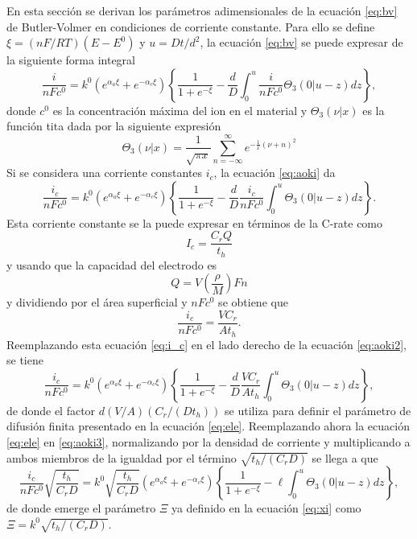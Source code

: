 En esta sección se derivan los parámetros adimensionales de la ecuación
\ref{eq:bv} de Butler-Volmer en condiciones de corriente constante. Para ello se 
define $\xi = (nF/RT)(E - E^0)$ y $u = D t / d^2$, la ecuación \ref{eq:bv} se 
puede expresar de la siguiente forma integral \cite{aoki1984}
\begin{equation}\label{eq:aoki}
    \frac{i}{n F c^0} = k^0 \left(e^{\alpha_a \xi} + e^{-\alpha_c \xi}\right) \left\{ \frac{1}{1+e^{-\xi}} - \frac{d}{D} \int_0^u \frac{i}{n F c^0} \Theta_3(0|u - z) dz \right\},
\end{equation}
donde $c^0$ es la concentración máxima del ion en el material y $\Theta_3(\nu|x)$ 
es la función tita \cite{bieniasz2015} dada por la siguiente expresión
\begin{equation}
    \Theta_3(\nu|x) = \frac{1}{\sqrt{\pi x}} \sum_{n=-\infty}^{\infty} e^{-\frac{1}{x}(\nu + n)^2}
\end{equation}
Si se considera una corriente constantes $i_c$, la ecuación \ref{eq:aoki} da
\begin{equation}\label{eq:aoki2}
    \frac{i_c}{n F c^0} = k^0 \left(e^{\alpha_a \xi} + e^{-\alpha_c \xi}\right) \left\{ \frac{1}{1+e^{-\xi}} - \frac{d}{D} \frac{i_c}{n F c^0} \int_0^u \Theta_3(0|u - z) dz \right\}.
\end{equation}
Esta corriente constante se la puede expresar en términos de la C-rate como
\begin{equation}
    I_c = \frac{C_r Q}{t_h}
\end{equation}
y usando que la capacidad del electrodo es
\begin{equation}
    Q = V \left( \frac{\rho}{M} \right) F n
\end{equation}
y dividiendo por el área superficial y $n F c^0$ se obtiene que
\begin{equation}\label{eq:i_c}
    \frac{i_c}{n F c^0} = \frac{V C_r}{A t_h}.
\end{equation}
Reemplazando esta ecuación \ref{eq:i_c} en el lado derecho de la ecuación 
\ref{eq:aoki2}, se tiene
\begin{equation}\label{eq:aoki3}
    \frac{i_c}{n F c^0} = k^0 \left(e^{\alpha_a \xi} + e^{-\alpha_c \xi}\right) \left\{ \frac{1}{1+e^{-\xi}} - \frac{d}{D} \frac{V C_r}{A t_h} \int_0^u \Theta_3(0|u - z) dz \right\},
\end{equation}
de donde el factor $d (V/A) (C_r / (D t_h))$ se utiliza para definir el 
parámetro de difusión finita presentado en la ecuación \ref{eq:ele}. Reemplazando 
ahora la ecuación \ref{eq:ele} en \ref{eq:aoki3}, normalizando por la densidad 
de corriente y multiplicando a ambos miembros de la igualdad por el término 
$\sqrt{t_h / (C_r D)}$ se llega a que
\begin{equation}\label{eq:aoki4}
    \frac{i_c}{n F c^0} \sqrt{\frac{t_h}{C_r D}} = k^0 \sqrt{\frac{t_h}{C_r D}}\left(e^{\alpha_a \xi} + e^{-\alpha_c \xi}\right) \left\{ \frac{1}{1+e^{-\xi}} - \ell \int_0^u \Theta_3(0|u - z) dz \right\},
\end{equation}
de donde emerge el parámetro $\Xi$ ya definido en la ecuación \ref{eq:xi} como 
$\Xi = k^0 \sqrt{t_h / (C_r D)}$.
